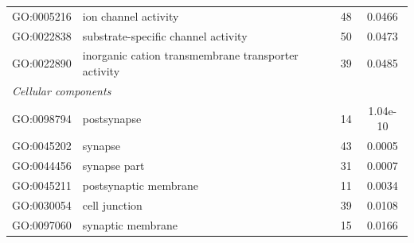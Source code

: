 \documentclass[10pt,letterpaper]{article}
\begin{document}
\begin{table}[]
\begin{tabular}{llcc}
GO:0005216                                 & ion channel activity                                       & 48                                                                                       & 0.0466                                \\
GO:0022838                                 & substrate-specific channel activity                        & 50                                                                                       & 0.0473                                \\
GO:0022890                                 & inorganic cation transmembrane transporter activity        & 39                                                                                       & 0.0485                                \\
\multicolumn{4}{l}{\textit{Cellular components}}                                                                                                                                                                                           \\
GO:0098794                                 & postsynapse                                                & 14                                                                                       & 1.04e-10                              \\
GO:0045202                                 & synapse                                                    & 43                                                                                       & 0.0005                                \\
GO:0044456                                 & synapse part                                               & 31                                                                                       & 0.0007                                \\
GO:0045211                                 & postsynaptic membrane                                      & 11                                                                                       & 0.0034                                \\
GO:0030054                                 & cell junction                                              & 39                                                                                       & 0.0108                                \\
GO:0097060                                 & synaptic membrane                                          & 15                                                                                       & 0.0166                                \\

\end{tabular}
\end{table}
\end{document}
